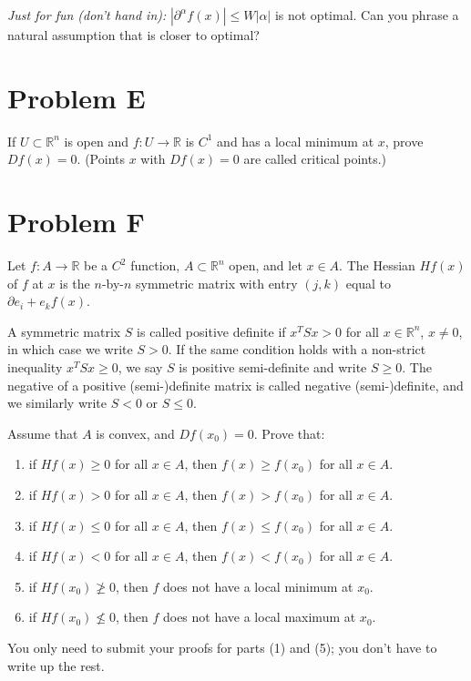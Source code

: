 \documentclass[lang=cn,11pt]{template}
\begin{document}
\textit{Just for fun (don’t hand in):} $|\partial^\alpha f(x)| \leq W |\alpha|$ is not optimal. Can you phrase a natural assumption that is closer to optimal?

\section*{Problem E}
If $U \subset \mathbb{R}^n$ is open and $f : U \to \mathbb{R}$ is $C^1$ and has a local minimum at $x$, prove $Df(x) = 0$. (Points $x$ with $Df(x) = 0$ are called critical points.)

\section*{Problem F}
Let $f : A \to \mathbb{R}$ be a $C^2$ function, $A \subset \mathbb{R}^n$ open, and let $x \in A$. The Hessian $Hf(x)$ of $f$ at $x$ is the $n$-by-$n$ symmetric matrix with entry $(j, k)$ equal to $\partial e_i + e_k f(x)$.

A symmetric matrix $S$ is called positive definite if $x^T S x > 0$ for all $x \in \mathbb{R}^n$, $x \neq 0$, in which case we write $S > 0$. If the same condition holds with a non-strict inequality $x^T S x \geq 0$, we say $S$ is positive semi-definite and write $S \geq 0$. The negative of a positive (semi-)definite matrix is called negative (semi-)definite, and we similarly write $S < 0$ or $S \leq 0$.

Assume that $A$ is convex, and $Df(x_0) = 0$. Prove that:
\begin{enumerate}
    \item if $Hf(x) \geq 0$ for all $x \in A$, then $f(x) \geq f(x_0)$ for all $x \in A$.
    \item if $Hf(x) > 0$ for all $x \in A$, then $f(x) > f(x_0)$ for all $x \in A$.
    \item if $Hf(x) \leq 0$ for all $x \in A$, then $f(x) \leq f(x_0)$ for all $x \in A$.
    \item if $Hf(x) < 0$ for all $x \in A$, then $f(x) < f(x_0)$ for all $x \in A$.
    \item if $Hf(x_0) \not\geq 0$, then $f$ does not have a local minimum at $x_0$.
    \item if $Hf(x_0) \not\leq 0$, then $f$ does not have a local maximum at $x_0$.
\end{enumerate}

You only need to submit your proofs for parts (1) and (5); you don’t have to write up the rest.
\end{document}
